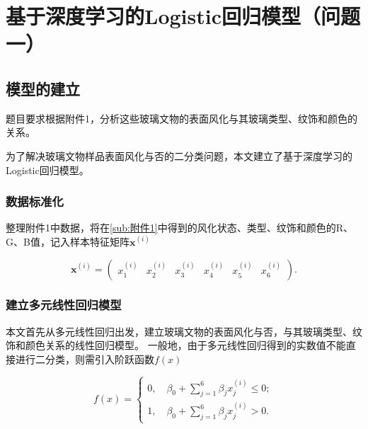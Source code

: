 \section{基于深度学习的Logistic回归模型（问题一）} %
\label{sec:section_基于深度学习的Logistic回归模型}

\subsection{模型的建立} %
\label{sub:模型的建立}

题目要求根据附件1，分析这些玻璃文物的表面风化与其玻璃类型、纹饰和颜色的关系。

为了解决玻璃文物样品表面风化与否的二分类问题，本文建立了基于深度学习的Logistic回归模型。

\subsubsection{数据标准化} %
\label{ssub:数据标准化}

整理附件1中数据，将在\ref{sub:附件1}中得到的风化状态、类型、纹饰和颜色的R、G、B值，记入样本特征矩阵$\boldsymbol{x}^{(i)}$

\begin{equation}
	\boldsymbol{x}^{(i)}=\left(\begin{array}{cccccc}x_{1}^{(i)}& x_{2}^{(i)}& x_{3}^{(i)}& x_{4}^{(i)}& x_{5}^{(i)}& x_{6}^{(i)}\end{array}\right).
\end{equation}


\subsubsection{建立多元线性回归模型} %
\label{ssub:建立多元线性回归模型}

本文首先从多元线性回归出发，建立玻璃文物的表面风化与否，与其玻璃类型、纹饰和颜色关系的线性回归模型。
一般地，由于多元线性回归得到的实数值不能直接进行二分类，则需引入阶跃函数$f(x)$

\begin{equation}
f(x)=\left\{\begin{array}{l}
0,\quad \beta_{0}+\sum_{j=1}^{6} \beta_{j} x_{j}^{(i)} \leqslant 0;\\
1,\quad \beta_{0}+\sum_{j=1}^{6} \beta_{j} x_{j}^{(i)}>0.
\end{array}\right.
\end{equation}

